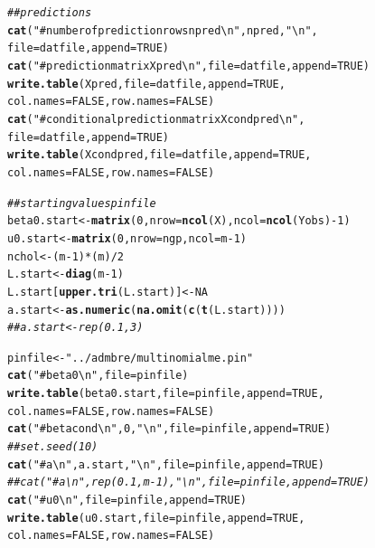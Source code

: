 \documentclass[12pt]{article}\usepackage[]{graphicx}\usepackage[]{color}
\makeatletter
\newcommand{\hlnum}[1]{\textcolor[rgb]{0.686,0.059,0.569}{#1}}%
\newcommand{\hlstr}[1]{\textcolor[rgb]{0.192,0.494,0.8}{#1}}%
\newcommand{\hlcom}[1]{\textcolor[rgb]{0.678,0.584,0.686}{\textit{#1}}}%
\newcommand{\hlopt}[1]{\textcolor[rgb]{0,0,0}{#1}}%
\newcommand{\hlstd}[1]{\textcolor[rgb]{0.345,0.345,0.345}{#1}}%
\newcommand{\hlkwb}[1]{\textcolor[rgb]{0.69,0.353,0.396}{#1}}%
\newcommand{\hlkwc}[1]{\textcolor[rgb]{0.333,0.667,0.333}{#1}}%
\newcommand{\hlkwd}[1]{\textcolor[rgb]{0.737,0.353,0.396}{\textbf{#1}}}%
\newenvironment{kframe}{%
 \def\at@end@of@kframe{}%
 \ifinner\ifhmode%
  \def\at@end@of@kframe{\end{minipage}}%
  \begin{minipage}{\columnwidth}%
 \fi\fi%
 \def\FrameCommand##1{\hskip\@totalleftmargin \hskip-\fboxsep
 \colorbox{shadecolor}{##1}\hskip-\fboxsep
     \hskip-\linewidth \hskip-\@totalleftmargin \hskip\columnwidth}%
 \MakeFramed {\advance\hsize-\width
   \@totalleftmargin\z@ \linewidth\hsize
   \@setminipage}}%
 {\par\unskip\endMakeFramed%
 \at@end@of@kframe}
\newenvironment{knitrout}{}{} %
\makeatother
\begin{document}
\begin{knitrout}
\begin{kframe}
\begin{alltt}
\hlcom{## predictions}
\hlkwd{cat}\hlstd{(}\hlstr{"# number of prediction rows npred \textbackslash{}n"}\hlstd{, npred,} \hlstr{"\textbackslash{}n"}\hlstd{,}
    \hlkwc{file} \hlstd{= datfile,} \hlkwc{append} \hlstd{=} \hlnum{TRUE}\hlstd{)}
\hlkwd{cat}\hlstd{(}\hlstr{"# prediction matrix Xpred \textbackslash{}n"}\hlstd{,} \hlkwc{file} \hlstd{= datfile,} \hlkwc{append} \hlstd{=} \hlnum{TRUE}\hlstd{)}
\hlkwd{write.table}\hlstd{(Xpred,} \hlkwc{file} \hlstd{= datfile,} \hlkwc{append} \hlstd{=} \hlnum{TRUE}\hlstd{,}
            \hlkwc{col.names} \hlstd{=} \hlnum{FALSE}\hlstd{,} \hlkwc{row.names} \hlstd{=} \hlnum{FALSE}\hlstd{)}
\hlkwd{cat}\hlstd{(}\hlstr{"# conditional prediction matrix Xcondpred \textbackslash{}n"}\hlstd{,}
    \hlkwc{file} \hlstd{= datfile,} \hlkwc{append} \hlstd{=} \hlnum{TRUE}\hlstd{)}
\hlkwd{write.table}\hlstd{(Xcondpred,} \hlkwc{file} \hlstd{= datfile,} \hlkwc{append} \hlstd{=} \hlnum{TRUE}\hlstd{,}
            \hlkwc{col.names} \hlstd{=} \hlnum{FALSE}\hlstd{,} \hlkwc{row.names} \hlstd{=} \hlnum{FALSE}\hlstd{)}

\hlcom{## starting values pinfile}
\hlstd{beta0.start} \hlkwb{<-} \hlkwd{matrix}\hlstd{(}\hlnum{0}\hlstd{,} \hlkwc{nrow} \hlstd{=} \hlkwd{ncol}\hlstd{(X),} \hlkwc{ncol} \hlstd{=} \hlkwd{ncol}\hlstd{(Yobs)} \hlopt{-} \hlnum{1}\hlstd{)}
\hlstd{u0.start} \hlkwb{<-} \hlkwd{matrix}\hlstd{(}\hlnum{0}\hlstd{,} \hlkwc{nrow} \hlstd{= ngp,} \hlkwc{ncol} \hlstd{= m} \hlopt{-} \hlnum{1}\hlstd{)}
\hlstd{nchol} \hlkwb{<-} \hlstd{(m}\hlopt{-}\hlnum{1}\hlstd{)}\hlopt{*}\hlstd{(m)}\hlopt{/}\hlnum{2}
\hlstd{L.start} \hlkwb{<-} \hlkwd{diag}\hlstd{(m}\hlopt{-}\hlnum{1}\hlstd{)}
\hlstd{L.start[}\hlkwd{upper.tri}\hlstd{(L.start)]} \hlkwb{<-} \hlnum{NA}
\hlstd{a.start} \hlkwb{<-} \hlkwd{as.numeric}\hlstd{(}\hlkwd{na.omit}\hlstd{(}\hlkwd{c}\hlstd{(}\hlkwd{t}\hlstd{(L.start))))}
\hlcom{##a.start <- rep(0.1, 3)}

\hlstd{pinfile} \hlkwb{<-} \hlstr{"../admbre/multinomialme.pin"}
\hlkwd{cat}\hlstd{(}\hlstr{"# beta0 \textbackslash{}n"}\hlstd{,} \hlkwc{file} \hlstd{= pinfile)}
\hlkwd{write.table}\hlstd{(beta0.start,} \hlkwc{file} \hlstd{= pinfile,} \hlkwc{append} \hlstd{=} \hlnum{TRUE}\hlstd{,}
            \hlkwc{col.names} \hlstd{=} \hlnum{FALSE}\hlstd{,} \hlkwc{row.names} \hlstd{=} \hlnum{FALSE}\hlstd{)}
\hlkwd{cat}\hlstd{(}\hlstr{"# betacond \textbackslash{}n"}\hlstd{,} \hlnum{0}\hlstd{,} \hlstr{"\textbackslash{}n"}\hlstd{,} \hlkwc{file} \hlstd{= pinfile,} \hlkwc{append} \hlstd{=} \hlnum{TRUE}\hlstd{)}
\hlcom{##set.seed(10)}
\hlkwd{cat}\hlstd{(}\hlstr{"# a \textbackslash{}n"}\hlstd{, a.start,} \hlstr{"\textbackslash{}n"}\hlstd{,} \hlkwc{file} \hlstd{= pinfile,} \hlkwc{append} \hlstd{=} \hlnum{TRUE}\hlstd{)}
\hlcom{##cat("# a \textbackslash{}n", rep(0.1, m-1), "\textbackslash{}n", file = pinfile, append = TRUE)}
\hlkwd{cat}\hlstd{(}\hlstr{"# u0 \textbackslash{}n"}\hlstd{,} \hlkwc{file} \hlstd{= pinfile,} \hlkwc{append} \hlstd{=} \hlnum{TRUE}\hlstd{)}
\hlkwd{write.table}\hlstd{(u0.start,} \hlkwc{file} \hlstd{= pinfile,} \hlkwc{append} \hlstd{=} \hlnum{TRUE}\hlstd{,}
            \hlkwc{col.names} \hlstd{=} \hlnum{FALSE}\hlstd{,} \hlkwc{row.names} \hlstd{=} \hlnum{FALSE}\hlstd{)}


\end{alltt}
\end{kframe}
\end{knitrout}
\end{document}
